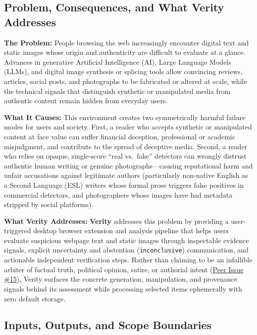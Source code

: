 \documentclass[11pt]{article}
\begin{document}
\subsection{Problem, Consequences, and What Verity Addresses}

\noindent\textbf{The Problem:} People browsing the web increasingly encounter digital text and static images whose origin and authenticity are difficult to evaluate at a glance. Advances in generative Artificial Intelligence (AI), Large Language Models (LLMs), and digital image synthesis or splicing tools allow convincing reviews, articles, social posts, and photographs to be fabricated or altered at scale, while the technical signals that distinguish synthetic or manipulated media from authentic content remain hidden from everyday users.

\vspace{0.4em}
\noindent\textbf{What It Causes:} This environment creates two symmetrically harmful failure modes for users and society. First, a reader who accepts synthetic or manipulated content at face value can suffer financial deception, professional or academic misjudgment, and contribute to the spread of deceptive media. Second, a reader who relies on opaque, single-score ``real vs.\ fake'' detectors can wrongly distrust authentic human writing or genuine photographs---causing reputational harm and unfair accusations against legitimate authors (particularly non-native English as a Second Language (ESL) writers whose formal prose triggers false positives in commercial detectors, and photographers whose images have had metadata stripped by social platforms).

\vspace{0.4em}
\noindent\textbf{What Verity Addresses:} \textbf{Verity} addresses this problem by providing a user-triggered desktop browser extension and analysis pipeline that helps users evaluate suspicious webpage text and static images through inspectable evidence signals, explicit uncertainty and abstention (\texttt{inconclusive}) communication, and actionable independent verification steps. Rather than claiming to be an infallible arbiter of factual truth, political opinion, satire, or authorial intent (\href{https://github.com/richy1337/Verity/issues/15}{Peer Issue \#15}), Verity surfaces the concrete generation, manipulation, and provenance signals behind its assessment while processing selected items ephemerally with zero default storage.

\subsection{Inputs, Outputs, and Scope Boundaries}
\end{document}

